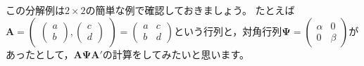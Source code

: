 \documentclass{ltjsbook}
\begin{document}
この分解例は$2 \times 2$の簡単な例で確認しておきましょう。
たとえば$\bm{A} = \begin{pmatrix}\begin{pmatrix}a\\b\end{pmatrix},\begin{pmatrix}c\\d\end{pmatrix}\end{pmatrix}=\begin{pmatrix} a & c \\b & d\end{pmatrix}$という行列と，対角行列$\bm{\Psi} = \begin{pmatrix}\alpha & 0 \\ 0 & \beta \end{pmatrix}$があったとして，$\bm{A\Psi A}'$の計算をしてみたいと思います。
\end{document}
